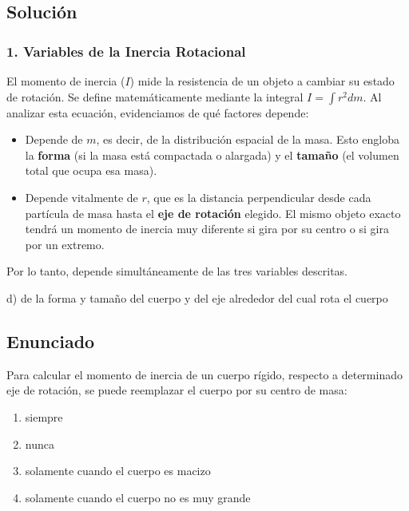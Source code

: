 \documentclass[12pt, a4paper]{article}
\begin{document}
\subsection*{Solución}

\subsubsection*{1. Variables de la Inercia Rotacional}

El momento de inercia ($I$) mide la resistencia de un objeto a cambiar su estado de rotación. Se define matemáticamente mediante la integral $I = \int r^2 dm$.
Al analizar esta ecuación, evidenciamos de qué factores depende:
\begin{itemize}
    \item Depende de $m$, es decir, de la distribución espacial de la masa. Esto engloba la \textbf{forma} (si la masa está compactada o alargada) y el \textbf{tamaño} (el volumen total que ocupa esa masa).
    \item Depende vitalmente de $r$, que es la distancia perpendicular desde cada partícula de masa hasta el \textbf{eje de rotación} elegido. El mismo objeto exacto tendrá un momento de inercia muy diferente si gira por su centro o si gira por un extremo.
\end{itemize}
Por lo tanto, depende simultáneamente de las tres variables descritas.

\begin{tcolorbox}[colback=green!5!white, colframe=green!50!black, title=Respuesta Final]
\centering \Large d) de la forma y tamaño del cuerpo y del eje alrededor del cual rota el cuerpo
\end{tcolorbox}

\newpage

\subsection*{Enunciado}
Para calcular el momento de inercia de un cuerpo rígido, respecto a determinado eje de rotación, se puede reemplazar el cuerpo por su centro de masa:
\begin{enumerate}[label=\alph*)]
    \item siempre
    \item nunca
    \item solamente cuando el cuerpo es macizo
    \item solamente cuando el cuerpo no es muy grande
\end{enumerate}
\end{document}
